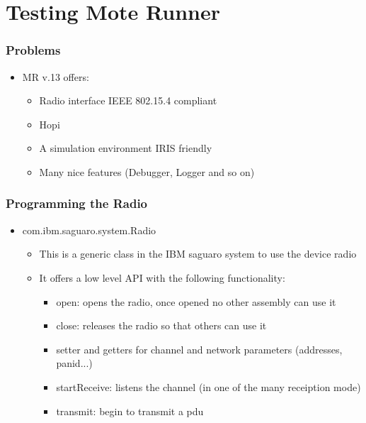 \section{Testing Mote Runner}
\begin{frame}[fragile]
  \frametitle{Problems}
  \begin{itemize}
    \item MR v.13 offers:
    \begin{itemize}
    	\item Radio interface IEEE 802.15.4 compliant
    	\item Hopi
    	\item A simulation environment IRIS friendly
    	\item Many nice features (Debugger, Logger and so on)
    \end{itemize}
  \end{itemize}
\end{frame}

\begin{frame}[fragile]
  \frametitle{Programming the Radio}
  \begin{itemize}
    \item com.ibm.saguaro.system.Radio
    \begin{itemize}
    	\item This is a generic class in the IBM saguaro system to use the device radio
    	\item It offers a low level API with the following functionality:
    	\begin{itemize}
	  \item open: opens the radio, once opened no other assembly can use it
	  \item close: releases the radio so that others can use it
	  \item setter and getters for channel and network parameters (addresses, panid...)
	  \item startReceive: listens the channel (in one of the many receiption mode)
	  \item transmit: begin to transmit a pdu
    	\end{itemize}
    \end{itemize}
  \end{itemize}
\end{frame}

